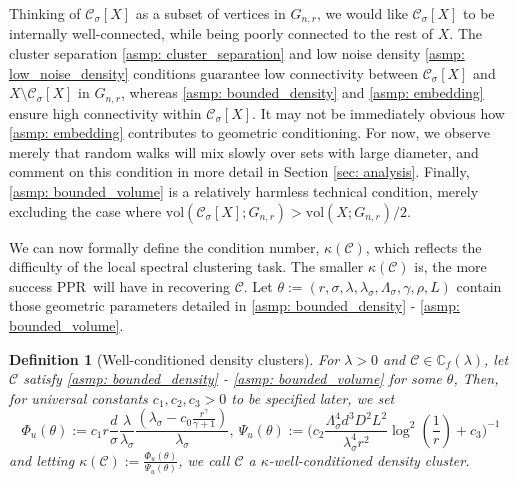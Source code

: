 \documentclass{article}
\newcommand{\diam}{\rho}
\newcommand{\vol}{\mathrm{vol}}
\newcommand{\1}{\mathbf{1}}
\newcommand{\Phibf}{\Phi_{u}}
\newcommand{\Psibf}{\Psi_{u}}
\newcommand{\Xbf}{X}             %
\newcommand{\Cbb}{\mathbb{C}}
\newcommand{\Cset}{\mathcal{C}}
\newcommand{\Csig}{\Cset_{\sigma}}
\newcommand{\pprspace}{{\sc PPR~}}
\theoremstyle{aldenthm}
\newtheorem{definition}{Definition}
\theoremstyle{aldenrmrk}
\begin{document}
Thinking of $\Csig[\Xbf]$ as a subset of vertices in $G_{n,r}$, we would like $\Csig[\Xbf]$ to be internally well-connected, while being poorly connected to the rest of $\Xbf$. The cluster separation \ref{asmp: cluster_separation} and low noise density \ref{asmp: low_noise_density} conditions guarantee low connectivity between $\Csig[\Xbf]$ and $\Xbf \setminus \Csig[\Xbf]$ in $G_{n,r}$, whereas \ref{asmp: bounded_density} and \ref{asmp: embedding} ensure high connectivity within $\Csig[\Xbf]$. It may not be immediately obvious how \ref{asmp: embedding} contributes to geometric conditioning. For now, we observe merely that random walks will mix slowly over sets with large diameter, and comment on this condition in more detail in Section \ref{sec: analysis}. Finally, \ref{asmp: bounded_volume} is a relatively harmless technical condition, merely excluding the case where $\vol(\Csig[\Xbf]; G_{n,r}) > \vol(\Xbf; G_{n,r})/2$. 

We can now formally define the condition number, $\kappa(\Cset)$, which reflects the difficulty of the local spectral clustering task. The smaller $\kappa(\Cset)$ is, the more success \pprspace will have in recovering $\Cset$. Let $\theta := (r, \sigma, \lambda, \lambda_{\sigma}, \Lambda_{\sigma}, \gamma, \diam, L)$ contain those geometric parameters detailed in \ref{asmp: bounded_density} - \ref{asmp: bounded_volume}.

\begin{definition}[Well-conditioned density clusters]
	For $\lambda > 0$ and $\Cset \in \Cbb_f(\lambda)$, let $\Cset$ satisfy \ref{asmp: bounded_density} - \ref{asmp: bounded_volume} for some $\theta$, Then, for universal constants $c_1, c_2, c_3 > 0$ to be specified later, we set
	\begin{equation}
	\label{eqn: condition_number_1}
	\Phibf(\theta) 
	:= c_1 r \frac{d}{\sigma} \frac{\lambda}{\lambda_{\sigma}} \frac{(\lambda_{\sigma} - c_0 \frac{r^{\gamma}}{\gamma + 1})}{\lambda_{\sigma}},~ 
	\Psibf(\theta) := \Biggl(c_2 \frac{\Lambda_{\sigma}^4 d^3 D^2 L^2}{\lambda_{\sigma}^4 r^2} \log^2\left(\frac{1}{r}\right) + c_3 \Biggr)^{-1}
	\end{equation}
	and letting $\kappa(\Cset) := \frac{\Phibf(\theta)}{\Psibf(\theta)}$, we call $\Cset$ a \textrm{$\kappa$-well-conditioned density cluster}.
\end{definition}
\end{document}
